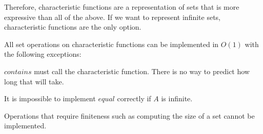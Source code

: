 Therefore, characteristic functions are a representation of sets that is more expressive than all of the above.
If we want to represent infinite sets, characteristic functions are the only option.

All set operations on characteristic functions can be implemented in $O(1)$ with the following exceptions:
\begin{compactitem}
 \item $contains$ must call the characteristic function. There is no way to predict how long that will take.
 \item It is impossible to implement $equal$ correctly if $A$ is infinite.
 \item Operations that require finiteness such as computing the size of a set cannot be implemented.
\end{compactitem}